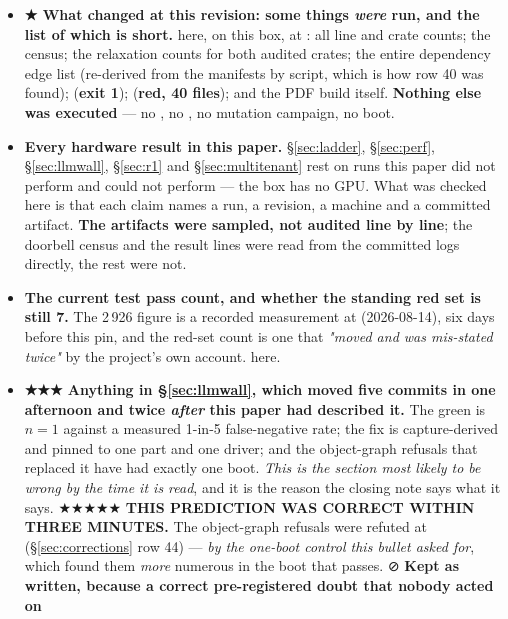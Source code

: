 \documentclass[10.5pt]{article}
\begin{document}
\begin{itemize}
\item \textbf{★ What changed at this revision: some things \emph{were} run, and the list of which
  is short.} \measured{} here, on this box, at : all line and crate counts; the
  \code{\#[test]} census; the  relaxation counts for both audited crates; the entire
  dependency edge list (re-derived from the manifests by script, which is how row 40 was found);
   (\textbf{exit 1}); 
  (\textbf{red, 40 files}); and the PDF build itself. \textbf{Nothing else was executed} — no
  , no , no mutation campaign, no boot.
\item \textbf{Every hardware result in this paper.} \S\ref{sec:ladder}, \S\ref{sec:perf},
  \S\ref{sec:llmwall}, \S\ref{sec:r1} and \S\ref{sec:multitenant} rest on runs this paper did not
  perform and could not perform — the box has no GPU. What was checked here is that each claim
  names a run, a revision, a machine and a committed artifact. \textbf{The artifacts were sampled,
  not audited line by line}; the  doorbell census and the  result lines were
  read from the committed logs directly, the rest were not.
\item \textbf{The current test pass count, and whether the standing red set is still 7.} The 2\,926
  figure is a recorded measurement at  (2026-08-14), six days before this pin, and
  the red-set count is one that \emph{"moved and was mis-stated twice"} by the project's own
  account. \unver{} here.
\item \textbf{★★★ Anything in \S\ref{sec:llmwall}, which moved five commits in one afternoon
  and twice \emph{after} this paper had described it.} The  green is $n = 1$ against
  a measured 1-in-5 false-negative rate; the fix is capture-derived and pinned to one part and one
  driver; and the object-graph refusals that replaced it have had exactly one boot.
  \emph{This is the section most likely to be wrong by the time it is read}, and it is the reason
  the closing note says what it says.
  \newline ★★★★★ \textbf{THIS PREDICTION WAS CORRECT WITHIN THREE MINUTES.} The object-graph
  refusals were refuted at  (\S\ref{sec:corrections} row 44) --- \emph{by the
  one-boot control this bullet asked for}, which found them \emph{more} numerous in the boot that
  passes. ⊘ \textbf{Kept as written, because a correct pre-registered doubt that nobody acted on
}
\end{itemize}
\end{document}
